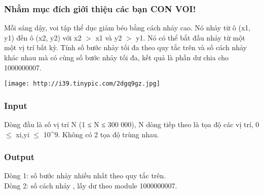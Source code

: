 







\subsubsection{   Nhằm mục đích giới thiệu các bạn CON VOI!  }

   Mỗi sáng dậy, voi tập thể dục giảm béo bằng cách nhảy cao. Nó nhảy từ ô (x1, y1) đến ô (x2, y2) với x2 $>$ x1 và y2 $>$ y1. Nó có thể bắt đầu nhảy từ một một vị trí bất kỳ. Tính số bước nhảy tối đa theo quy tắc trên và số cách nhảy khác nhau mà có cùng số bước nhảy tối đa, kết quả là phần dư chia cho 1000000007.  

\href{http://tinypic.com}{}


\texttt{[image: http://i39.tinypic.com/2dgq9gz.jpg]}

\subsubsection{   Input  }

   Dòng đầu là số vị trí N (1 ≤ N ≤ 300 000), N dòng tiếp theo là tọa độ các vị trí, 0  $\le$ xi,yi $\le$ 10\textasciicircum9. Không có 2 tọa độ trùng nhau.  

\subsubsection{   Output  }

   Dòng 1: số bước nhảy nhiều nhất theo quy tắc trên.   
\\   Dòng 2: số cách nhảy , lấy dư theo module 1000000007.  

